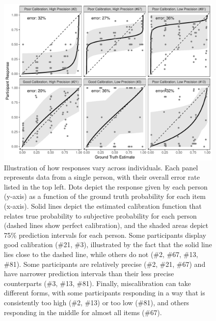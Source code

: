\documentclass[doc]{apa6} %
\begin{document}
\begin{figure}[p]
\begin{center}
\includegraphics[scale=.7]{examples.pdf} \vspace*{6pt}
\caption{Illustration of how responses vary across individuals. Each panel represents data from a single person, with their overall error rate listed in the top left. Dots depict the response given by each person (y-axis) as a function of the ground truth probability for each item (x-axis). Solid lines depict the estimated calibration function that relates true probability to subjective probability for each person (dashed lines show perfect calibration), and the shaded areas depict 75\% prediction intervals for each person. Some participants display good calibration (\#21, \#3), illustrated by the fact that the solid line lies close to the dashed line, while others do not (\#2, \#67, \#13, \#81). Some participants are relatively precise (\#2, \#21, \#67) and have narrower prediction intervals than their less precise counterparts (\#3, \#13, \#81). Finally, miscalibration can take different forms, with some participants responding in a way that is consistently too high (\#2, \#13) or too low (\#81), and others responding in the middle for almost all items (\#67).}
\label{examples}
\end{center}
\end{figure}
\end{document}
